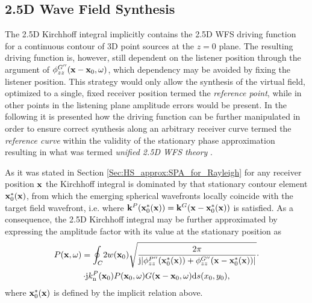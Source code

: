 \subsection{2.5D Wave Field Synthesis}

The 2.5D Kirchhoff integral implicitly contains the 2.5D WFS driving function for a continuous contour of 3D point sources at the $z = 0$ plane.
The resulting driving function is, however, still dependent on the listener position through the argument of $\phi^{G''}_{zz}(\mathbf{x}-\mathbf{x}_0,\omega)$, which dependency may be avoided by fixing the listener position.
This strategy would only allow the synthesis of the virtual field, optimized to a single, fixed receiver position termed the \emph{reference point}, while in other points in the listening plane amplitude errors would be present.
In the following it is presented how the driving function can be further manipulated in order to ensure correct synthesis along an arbitrary receiver curve termed the \emph{reference curve} within the validity of the stationary phase approximation resulting in what was termed \emph{unified 2.5D WFS theory} \cite{Firtha2016}.


As it was stated in Section \ref{Sec:HS_approx:SPA_for_Rayleigh} for any receiver position $\mathbf{x}$ the Kirchhoff integral is dominated by that stationary contour element $\mathbf{x}_0^*(\mathbf{x})$, from which the emerging spherical wavefronts locally coincide with the target field wavefront, i.e. where $\mathbf{k}^P(\mathbf{x}_0^*(\mathbf{x})) = \mathbf{k}^G(\mathbf{x} - \mathbf{x}_0^*(\mathbf{x}))$ is satisfied.
As a consequence, the 2.5D Kirchhoff integral may be further approximated by expressing the amplitude factor with its value at the stationary position as
\begin{multline}
P(\mathbf{x},\omega) = 
\oint_{C}
\! 2 w(\mathbf{x}_0) 
\sqrt{\frac{2 \pi}{\mathrm{j} |\phi^{P''}_{zz}(\mathbf{x}_0^*(\mathbf{x})) +\phi^{G''}_{zz}(\mathbf{x}-\mathbf{x}_0^*(\mathbf{x}))|}}
\cdot \\ \cdot
\mathrm{j} k_{\mathrm{n}}^P(\mathbf{x}_0) 	P(\mathbf{x}_0,\omega)
G(\mathbf{x}-\mathbf{x}_0,\omega) \mathrm{d} s(x_0,y_0),
\label{Eq:SFS_theory:25D_KI_appr}
\end{multline}
where $\mathbf{x}_0^*(\mathbf{x})$ is defined by the implicit relation above.

